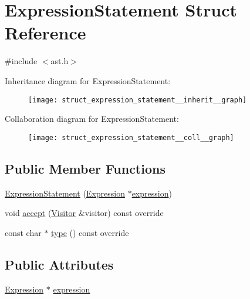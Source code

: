 \hypertarget{struct_expression_statement}{}\section{Expression\+Statement Struct Reference}
\label{struct_expression_statement}


{\ttfamily \#include $<$ast.\+h$>$}



Inheritance diagram for Expression\+Statement\+:\nopagebreak
\begin{figure}[H]
\begin{center}
\leavevmode
\texttt{[image: struct\_expression\_statement\_\_inherit\_\_graph]}
\end{center}
\end{figure}


Collaboration diagram for Expression\+Statement\+:\nopagebreak
\begin{figure}[H]
\begin{center}
\leavevmode
\texttt{[image: struct\_expression\_statement\_\_coll\_\_graph]}
\end{center}
\end{figure}
\subsection*{Public Member Functions}
\begin{DoxyCompactItemize}
\item 
\hyperlink{struct_expression_statement_ad195f09357c26895bf7b8ac7e30ddde3}{Expression\+Statement} (\hyperlink{struct_expression}{Expression} $\ast$\hyperlink{struct_expression_statement_af8fa751297f7dd719ebe74d62201fc3a}{expression})
\item 
void \hyperlink{struct_expression_statement_a6463f779ec4140b2510d854726aefd40}{accept} (\hyperlink{struct_visitor}{Visitor} \&visitor) const override
\item 
const char $\ast$ \hyperlink{struct_expression_statement_a39b8f80f97a0a5f346c1e34f1ba6939c}{type} () const override
\end{DoxyCompactItemize}
\subsection*{Public Attributes}
\begin{DoxyCompactItemize}
\item 
\hyperlink{struct_expression}{Expression} $\ast$ \hyperlink{struct_expression_statement_af8fa751297f7dd719ebe74d62201fc3a}{expression}
\end{DoxyCompactItemize}


